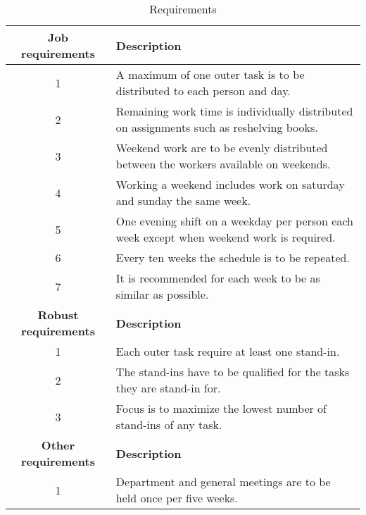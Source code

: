 \begin{table}[H]
\caption{Requirements}
\label{int:3}
\begin{tabular}{|c|l|}
\hline
\textbf{Job requirements} & \textbf{Description} \\ \hline
1 & A maximum of one outer task is to be distributed to each person and day.
\\ \hline 
2 & Remaining work time is individually distributed on assignments such as reshelving books.
\\ \hline
3 & Weekend work are to be evenly distributed between the workers available on weekends. 
\\ \hline 
4 & Working a weekend includes work on saturday and sunday the same week.
\\ \hline 
5 & One evening shift on a weekday per person each week except when weekend work is required.
\\ \hline 
6 & Every ten weeks the schedule is to be repeated.
\\ \hline 
7 & It is recommended for each week to be as similar as possible.
\\ \hline 

\textbf{Robust requirements} & \textbf{Description} \\ \hline
1 & Each outer task require at least one stand-in.
\\ \hline 
2 & The stand-ins have to be qualified for the tasks they are stand-in for.
\\ \hline 
3 & Focus is to maximize the lowest number of stand-ins of any task.
\\ \hline 

\textbf{Other requirements} & \textbf{Description} \\ \hline
1 & Department and general meetings are to be held once per five weeks.
\\ \hline 
\end{tabular}
\end{table}
\medskip

